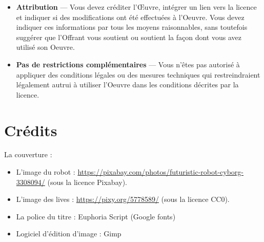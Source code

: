 \documentclass[12pt]{book}
\begin{document}
\begin{tcolorbox}[colback=my-grey,
	colframe=my-grey,  
	center, arc=0pt,outer arc=0pt,
	valign=top, 
	halign=left,
	width=\textwidth]
	\begin{itemize}
		\item[] \textbf{Attribution} — Vous devez créditer l'Œuvre, intégrer un lien vers la licence et indiquer si des modifications ont été effectuées à l'Oeuvre. Vous devez indiquer ces informations par tous les moyens raisonnables, sans toutefois suggérer que l'Offrant vous soutient ou soutient la façon dont vous avez utilisé son Oeuvre. 
		\item[] \textbf{Pas de restrictions complémentaires} — Vous n'êtes pas autorisé à appliquer des conditions légales ou des mesures techniques qui restreindraient légalement autrui à utiliser l'Oeuvre dans les conditions décrites par la licence.
	\end{itemize}
	
\end{tcolorbox}

\chapter*{Crédits}

La couverture : 
\begin{itemize}
	\item L'image du robot : \url{https://pixabay.com/photos/futuristic-robot-cyborg-3308094/} (sous la licence Pixabay).
	\item L'image des lives : \url{https://pixy.org/5778589/} (sous la licence CC0).
	\item La police du titre : Euphoria Script (Google fonts)
	\item Logiciel d'édition d'image : Gimp
\end{itemize}







\ifx\wholebook\relax\else
% 
% 
	
\end{document}
